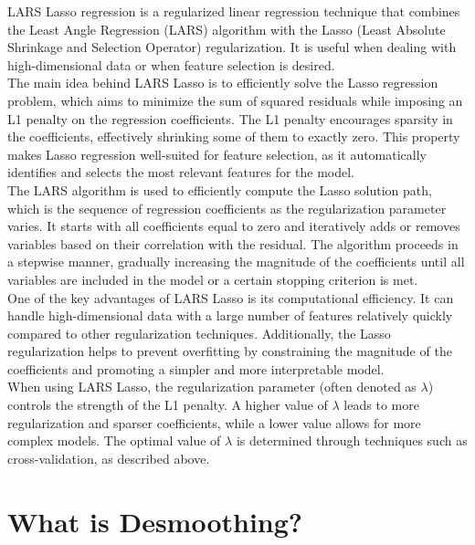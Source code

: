 \documentclass{ledger}
\begin{document}
LARS Lasso regression is a regularized linear regression technique that combines the Least Angle Regression (LARS) algorithm with the Lasso (Least Absolute Shrinkage and Selection Operator) regularization. It is useful when dealing with high-dimensional data or when feature selection is desired. \\

The main idea behind LARS Lasso is to efficiently solve the Lasso regression problem, which aims to minimize the sum of squared residuals while imposing an L1 penalty on the regression coefficients. The L1 penalty encourages sparsity in the coefficients, effectively shrinking some of them to exactly zero. This property makes Lasso regression well-suited for feature selection, as it automatically identifies and selects the most relevant features for the model. \\

The LARS algorithm is used to efficiently compute the Lasso solution path, which is the sequence of regression coefficients as the regularization parameter varies. It starts with all coefficients equal to zero and iteratively adds or removes variables based on their correlation with the residual. The algorithm proceeds in a stepwise manner, gradually increasing the magnitude of the coefficients until all variables are included in the model or a certain stopping criterion is met. \\

One of the key advantages of LARS Lasso is its computational efficiency. It can handle high-dimensional data with a large number of features relatively quickly compared to other regularization techniques. Additionally, the Lasso regularization helps to prevent overfitting by constraining the magnitude of the coefficients and promoting a simpler and more interpretable model. \\

When using LARS Lasso, the regularization parameter (often denoted as $\lambda$) controls the strength of the L1 penalty. A higher value of $\lambda$ leads to more regularization and sparser coefficients, while a lower value allows for more complex models. The optimal value of $\lambda$ is determined through techniques such as cross-validation, as described above. \\

\section{What is Desmoothing?}
\end{document}
